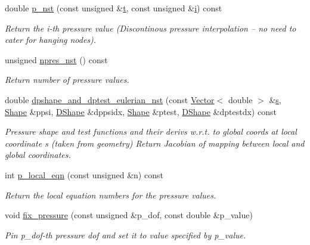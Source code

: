 \begin{DoxyCompactItemize}
double \hyperlink{classoomph_1_1QCrouzeixRaviartElement_ab7e5c4345c95002750592f7dcaa7a1c5}{p\+\_\+nst} (const unsigned \&\hyperlink{cfortran_8h_af6f0bd3dc13317f895c91323c25c2b8f}{t}, const unsigned \&\hyperlink{cfortran_8h_adb50e893b86b3e55e751a42eab3cba82}{i}) const
\begin{DoxyCompactList}\small\item\em Return the i-\/th pressure value (Discontinous pressure interpolation -- no need to cater for hanging nodes). \end{DoxyCompactList}\item 
unsigned \hyperlink{classoomph_1_1QCrouzeixRaviartElement_a0cbd8f1a5e0814abdbfd34ae7c58b018}{npres\+\_\+nst} () const
\begin{DoxyCompactList}\small\item\em Return number of pressure values. \end{DoxyCompactList}\item 
double \hyperlink{classoomph_1_1QCrouzeixRaviartElement_a2324368cac84fd0e7d57ab5720c694ec}{dpshape\+\_\+and\+\_\+dptest\+\_\+eulerian\+\_\+nst} (const \hyperlink{classoomph_1_1Vector}{Vector}$<$ double $>$ \&\hyperlink{cfortran_8h_ab7123126e4885ef647dd9c6e3807a21c}{s}, \hyperlink{classoomph_1_1Shape}{Shape} \&ppsi, \hyperlink{classoomph_1_1DShape}{D\+Shape} \&dppsidx, \hyperlink{classoomph_1_1Shape}{Shape} \&ptest, \hyperlink{classoomph_1_1DShape}{D\+Shape} \&dptestdx) const
\begin{DoxyCompactList}\small\item\em Pressure shape and test functions and their derivs w.\+r.\+t. to global coords at local coordinate s (taken from geometry) Return Jacobian of mapping between local and global coordinates. \end{DoxyCompactList}\item 
int \hyperlink{classoomph_1_1QCrouzeixRaviartElement_a230286c5b2cb5532e649d392c408dad5}{p\+\_\+local\+\_\+eqn} (const unsigned \&n) const
\begin{DoxyCompactList}\small\item\em Return the local equation numbers for the pressure values. \end{DoxyCompactList}\item 
void \hyperlink{classoomph_1_1QCrouzeixRaviartElement_ae885b689682846f17db8d2e07f711838}{fix\+\_\+pressure} (const unsigned \&p\+\_\+dof, const double \&p\+\_\+value)
\begin{DoxyCompactList}\small\item\em Pin p\+\_\+dof-\/th pressure dof and set it to value specified by p\+\_\+value. \end{DoxyCompactList}\item 

\end{DoxyCompactItemize}
